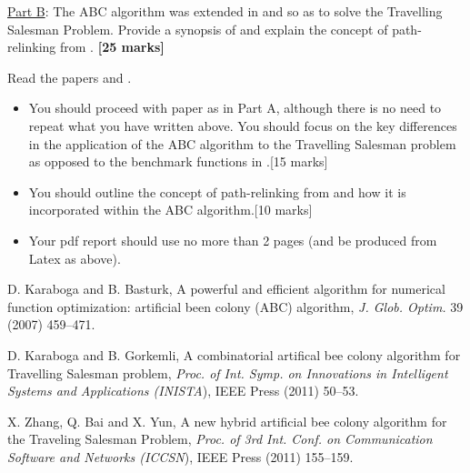 \documentclass{article}
\begin{document}
\noindent\underline{Part B}: The ABC algorithm was extended in \cite{KG11} and \cite{XBY11} so as to solve the Travelling Salesman Problem. Provide a synopsis of \cite{KG11} and explain the concept of path-relinking from \cite{XBY11}. \hfill{\bf [25 marks]}\smallskip

\noindent Read the papers \cite{KG11} and \cite{XBY11}.

\begin{itemize}

\item You should proceed with paper \cite{KG11} as in Part A, although there is no need to repeat what you have written above. You should focus on the key differences in the application of the ABC algorithm to the Travelling Salesman problem as opposed to the benchmark functions in \cite{KB07}.\hfill[15 marks]

\item You should outline the concept of path-relinking from \cite{XBY11} and how it is incorporated within the ABC algorithm.\hfill[10 marks]

\item Your pdf report should use no more than 2 pages (and be produced from Latex as above).

\end{itemize}


\begin{thebibliography}{99}

 D. Karaboga and B. Basturk, A powerful and efficient algorithm for numerical function optimization: artificial been colony (ABC) algorithm, \emph{J. Glob. Optim.\/} 39 (2007) 459--471.

 D. Karaboga and B. Gorkemli, A combinatorial artifical bee colony algorithm for Travelling Salesman problem, \emph{Proc. of Int. Symp. on Innovations in Intelligent Systems and Applications \emph{(}INISTA\/}), IEEE Press (2011) 50--53.

 X. Zhang, Q. Bai and X. Yun, A new hybrid artificial bee colony algorithm for the Traveling Salesman Problem, \emph{Proc. of \emph{3}rd Int. Conf. on Communication Software and Networks \emph{(}ICCSN\/}), IEEE Press (2011) 155--159.

\end{thebibliography}
\end{document}
